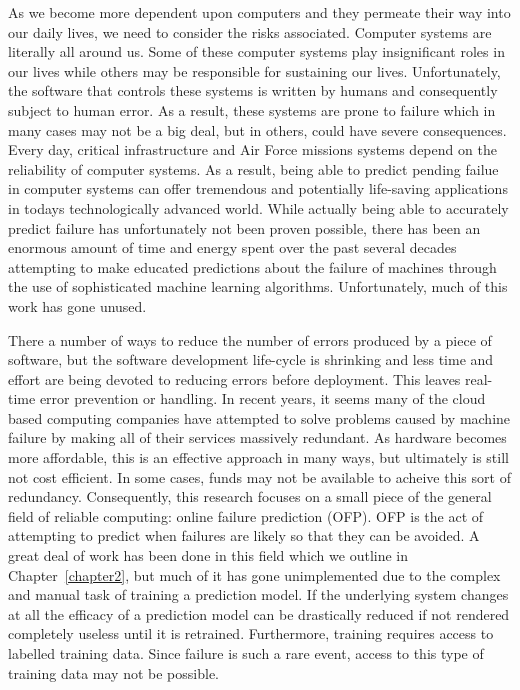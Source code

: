 As we become more dependent upon computers and they permeate their way into our
daily lives, we need to consider the risks associated.  Computer systems are
literally all around us.  Some of these computer systems play insignificant
roles in our lives while others may be responsible for sustaining our lives.
Unfortunately, the software that controls these systems is written by humans
and consequently subject to human error.  As a result, these systems are prone
to failure which in many cases may not be a big deal, but in others, could have
severe consequences.  Every day, critical infrastructure and Air Force missions
systems depend on the reliability of computer systems.  As a result, being able
to predict pending failue in computer systems can offer tremendous and
potentially life-saving applications in todays technologically advanced world.
While actually being able to accurately predict failure has unfortunately not
been proven possible, there has been an enormous amount of time and energy
spent over the past several decades attempting to make educated predictions
about the failure of machines through the use of sophisticated machine learning
algorithms.  Unfortunately, much of this work has gone unused.  

There a number of ways to reduce the number of errors produced by a piece of
software, but the software development life-cycle is shrinking and less time
and effort are being devoted to reducing errors before deployment.  This leaves
real-time error prevention or handling.  In recent years, it seems many of the
cloud based computing companies have attempted to solve problems caused by
machine failure by making all of their services massively redundant.  As
hardware becomes more affordable, this is an effective approach in many ways,
but ultimately is still not cost efficient.  In some cases, funds may not be
available to acheive this sort of redundancy.  Consequently, this research
focuses on a small piece of the general field of reliable computing: online
failure prediction (OFP).  OFP is the act of attempting to predict when
failures are likely so that they can be avoided.  A great deal of work has been
done in this field which we outline in Chapter~\ref{chapter2}, but much of it
has gone unimplemented due to the complex and manual task of training a
prediction model.  If the underlying system changes at all the efficacy of a
prediction model can be drastically reduced if not rendered completely useless
until it is retrained.  Furthermore, training requires access to labelled
training data.  Since failure is such a rare event, access to this type of
training data may not be possible.  

